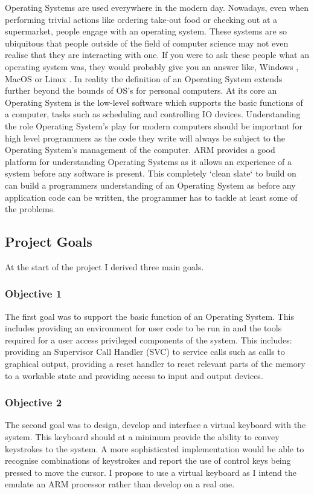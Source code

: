 Operating Systems\cite{os} are used everywhere in the modern day. Nowadays, even when performing trivial actions like ordering take-out food or checking out at a supermarket, people engage with an operating system. These systems are so ubiquitous that people outside of the field of computer science may not even realise that they are interacting with one. If you were  to ask these people what an operating system was, they would probably give you an answer like, Windows \cite{windows}, MacOS \cite{apple} or Linux \cite{linux}. In reality the definition of an Operating System extends further beyond the bounds of OS's for personal computers. At its core an Operating System is the low-level software which supports the basic functions of a computer, tasks such as scheduling and controlling IO devices. Understanding the role Operating System's play for modern computers should be important for high level programmers as the code they write will always be subject to the Operating System's management of the computer. ARM provides a good platform for understanding Operating Systems as it allows an experience of a system before any software is present. This completely `clean slate` to build on can build a programmers understanding of an Operating System as before any application code can be written, the programmer has to tackle at least some of the problems. 

\subsection{Project Goals}
At the start of the project I derived three main goals.
\subsubsection{Objective 1}
\label{obj1}
The first goal was to support the basic function of an Operating System. This includes providing an environment for user code to be run in and the tools required for a user access privileged components of the system. This includes: providing an Supervisor Call Handler (SVC) to service calls such as calls to graphical output, providing a reset handler to reset relevant parts of the memory to a workable state and providing access to input and output devices. 
\subsubsection{Objective 2}
\label{obj2}
The second goal was to design, develop and interface a virtual keyboard with the system. This keyboard should at a minimum provide the ability to convey keystrokes to the system. A more sophisticated implementation would be able to recognise combinations of keystrokes and report the use of control keys being pressed to move the cursor. I propose to use a virtual keyboard as I intend the emulate an ARM processor rather than develop on a real one. 
